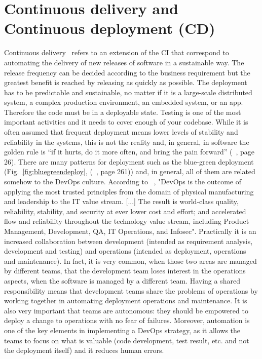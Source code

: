 \documentclass[a4paper,
               keeplastbox,   %
               ]{jacow}
\begin{document}
\section{Continuous delivery and Continuous deployment (CD)}
Continuous delivery~\cite{CD} refers to an extension of the CI that correspond to automating the delivery of new releases of software in a sustainable way. The release frequency can be decided according to the business requirement but the greatest benefit is reached by releasing as quickly as possible. 
The deployment has to be predictable and sustainable, no matter if it is a large-scale distributed system, a complex production environment, an embedded system, or an app. Therefore the code must be in a deployable state. Testing is one of the most important activities and it needs to cover enough of your codebase. 
While it is often assumed that frequent deployment means lower levels of stability and reliability in the systems, this is not the reality and, in general, in software the golden rule is “if it hurts, do it more often, and bring the pain forward” (~\cite{CD}, page 26).
There are many patterns for deployment such as the blue-green deployment (Fig.~\ref{fig:bluegreendeploy}, (~\cite{CD}, page 261)) and, in general, all of them are related somehow to the DevOps culture. According to ~\cite{DevOps}, "DevOps is the outcome of applying the most trusted principles from the domain of physical manufacturing and leadership to the IT value stream. [...] The result is world-class quality, reliability, stability, and security at ever lower cost and effort; and accelerated flow and reliability throughout the technology value stream, including Product Management, Development, QA, IT Operations, and Infosec". Practically it is an increased collaboration between development (intended as requirement analysis, development and testing) and operations (intended as deployment, operations and maintenance). In fact, it is very common, when those two areas are managed by different teams, that the development team loses interest in the operations aspects, when the software is managed by a different team. Having a shared responsibility means that development teams share the problems of operations by working together in automating deployment operations and maintenance. It is also very important that teams are autonomous: they should be empowered to deploy a change to operations with no fear of failures. 
Moreover, automation is one of the key elements in implementing a DevOps strategy, as it allows the teams to focus on what is valuable (code development, test result, etc. and not the deployment itself) and it reduces human errors.
\end{document}
